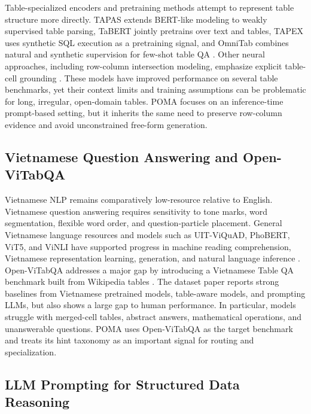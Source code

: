 \documentclass[]{interact}
\begin{document}
Table-specialized encoders and pretraining methods attempt to represent table structure more directly. TAPAS extends BERT-like modeling to weakly supervised table parsing, TaBERT jointly pretrains over text and tables, TAPEX uses synthetic SQL execution as a pretraining signal, and OmniTab combines natural and synthetic supervision for few-shot table QA \citep{herzig-etal-2020-tapas,yin-etal-2020-tabert,liu-etal-2022-tapex,jiang-etal-2022-omnitab}. Other neural approaches, including row-column intersection modeling, emphasize explicit table-cell grounding \citep{glass-etal-2021-capturing}. These models have improved performance on several table benchmarks, yet their context limits and training assumptions can be problematic for long, irregular, open-domain tables. POMA focuses on an inference-time prompt-based setting, but it inherits the same need to preserve row-column evidence and avoid unconstrained free-form generation.

\subsection{Vietnamese Question Answering and Open-ViTabQA}

Vietnamese NLP remains comparatively low-resource relative to English. Vietnamese question answering requires sensitivity to tone marks, word segmentation, flexible word order, and question-particle placement. General Vietnamese language resources and models such as UIT-ViQuAD, PhoBERT, ViT5, and ViNLI have supported progress in machine reading comprehension, Vietnamese representation learning, generation, and natural language inference \citep{nguyen-etal-2020-vietnamese,nguyen-nguyen-2020-phobert,phan-etal-2022-vit5,huynh-etal-2022-vinli}. Open-ViTabQA addresses a major gap by introducing a Vietnamese Table QA benchmark built from Wikipedia tables \citep{openvitabqa2025}. The dataset paper reports strong baselines from Vietnamese pretrained models, table-aware models, and prompting LLMs, but also shows a large gap to human performance. In particular, models struggle with merged-cell tables, abstract answers, mathematical operations, and unanswerable questions. POMA uses Open-ViTabQA as the target benchmark and treats its hint taxonomy as an important signal for routing and specialization.

\subsection{LLM Prompting for Structured Data Reasoning}
\end{document}
